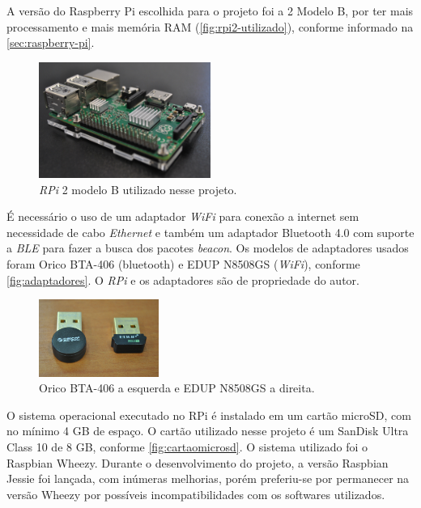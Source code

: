 \documentclass[
		12pt,				%
		openright,			%
		oneside,			%
		a4paper,			%
		chapter=TITLE,		%
		english,			%
		brazil				%
	]{abntex2}
\begin{document}
A versão do Raspberry Pi escolhida para o projeto foi a 2 Modelo B, por ter mais processamento e mais memória RAM (\autoref{fig:rpi2-utilizado}), conforme informado na \autoref{sec:raspberry-pi}.

\begin{figure}[htb]
	\caption{\label{fig:rpi2-utilizado}\textit{RPi} 2 modelo B utilizado nesse projeto.}
	\begin{center}
		\includegraphics[width=0.5\textwidth]{img/rpi2.jpg}
	\end{center}
\end{figure}

É necessário o uso de um adaptador \textit{WiFi} para conexão a internet sem necessidade de cabo \textit{Ethernet} e também um adaptador Bluetooth 4.0 com suporte a \textit{BLE} para fazer a busca dos pacotes \textit{beacon}. Os modelos de adaptadores usados foram Orico BTA-406 (bluetooth) e EDUP N8508GS (\textit{WiFi}), conforme \autoref{fig:adaptadores}. O \textit{RPi} e os adaptadores são de propriedade do autor.

\begin{figure}[htb]
	\caption{\label{fig:adaptadores}Orico BTA-406 a esquerda e EDUP N8508GS a direita.}
	\begin{center}
		\includegraphics[width=0.35\textwidth]{img/adaptadores.jpg}
	\end{center}
\end{figure}

O sistema operacional executado no RPi é instalado em um cartão microSD, com no mínimo 4 GB de espaço. O cartão utilizado nesse projeto é um SanDisk Ultra Class 10 de 8 GB, conforme \autoref{fig:cartaomicrosd}. O sistema utilizado foi o Raspbian Wheezy. Durante o desenvolvimento do projeto, a versão Raspbian Jessie foi lançada, com inúmeras melhorias, porém preferiu-se por permanecer na versão Wheezy por possíveis incompatibilidades com os softwares utilizados.
\end{document}

